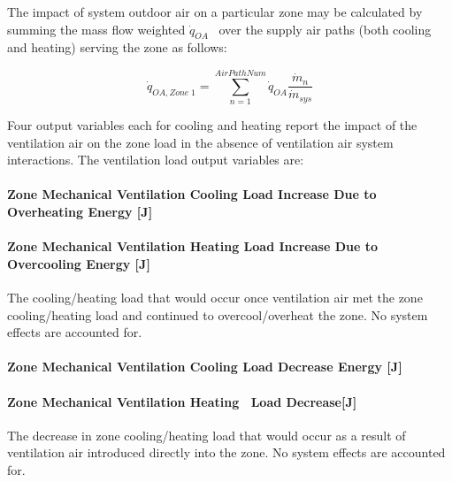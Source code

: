 The impact of system outdoor air on a particular zone may be calculated by summing the mass flow weighted \({\dot q_{OA}}\) ~over the supply air paths (both cooling and heating) serving the zone as follows:

\begin{equation}
{\dot q_{OA,Zone\;1}} = \sum\limits_{n = 1}^{AirPathNum} {{{\dot q}_{OA}}\frac{{{{\dot m}_n}}}{{{{\dot m}_{sys}}}}}
\end{equation}

Four output variables each for cooling and heating report the impact of the ventilation air on the zone load in the absence of ventilation air system interactions. The ventilation load output variables are:

\paragraph{Zone Mechanical Ventilation Cooling Load Increase Due to Overheating Energy {[}J{]}}\label{zone-mechanical-ventilation-cooling-load-increase-due-to-overheating-energy-j}

\paragraph{Zone Mechanical Ventilation Heating Load Increase Due to Overcooling Energy {[}J{]}}\label{zone-mechanical-ventilation-heating-load-increase-due-to-overcooling-energy-j}

The cooling/heating load that would occur once ventilation air met the zone cooling/heating load and continued to overcool/overheat the zone. No system effects are accounted for.

\paragraph{Zone Mechanical Ventilation Cooling Load Decrease Energy {[}J{]}}\label{zone-mechanical-ventilation-cooling-load-decrease-energy-j}

\paragraph{Zone Mechanical Ventilation Heating~ Load Decrease{[}J{]}}\label{zone-mechanical-ventilation-heating-load-decreasej}

The decrease in zone cooling/heating load that would occur as a result of ventilation air introduced directly into the zone. No system effects are accounted for.

